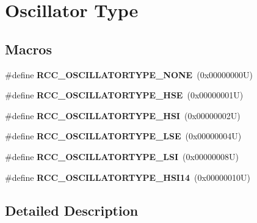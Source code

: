 \hypertarget{group___r_c_c___oscillator___type}{}\section{Oscillator Type}
\label{group___r_c_c___oscillator___type}
\subsection*{Macros}
\begin{DoxyCompactItemize}
\item 
\mbox{\label{group___r_c_c___oscillator___type_ga5a790362c5d7c4263f0f75a7367dd6b9}} 
\#define {\bfseries R\+C\+C\+\_\+\+O\+S\+C\+I\+L\+L\+A\+T\+O\+R\+T\+Y\+P\+E\+\_\+\+N\+O\+NE}~(0x00000000\+U)
\item 
\mbox{\label{group___r_c_c___oscillator___type_ga28cacd402dec84e548c9e4ba86d4603f}} 
\#define {\bfseries R\+C\+C\+\_\+\+O\+S\+C\+I\+L\+L\+A\+T\+O\+R\+T\+Y\+P\+E\+\_\+\+H\+SE}~(0x00000001\+U)
\item 
\mbox{\label{group___r_c_c___oscillator___type_gaa7ff7cbe9b0c2c511b0d0555e2a32a23}} 
\#define {\bfseries R\+C\+C\+\_\+\+O\+S\+C\+I\+L\+L\+A\+T\+O\+R\+T\+Y\+P\+E\+\_\+\+H\+SI}~(0x00000002\+U)
\item 
\mbox{\label{group___r_c_c___oscillator___type_ga7036aec5659343c695d795e04d9152ba}} 
\#define {\bfseries R\+C\+C\+\_\+\+O\+S\+C\+I\+L\+L\+A\+T\+O\+R\+T\+Y\+P\+E\+\_\+\+L\+SE}~(0x00000004\+U)
\item 
\mbox{\label{group___r_c_c___oscillator___type_ga3b7abb8ce0544cca0aa4550540194ce2}} 
\#define {\bfseries R\+C\+C\+\_\+\+O\+S\+C\+I\+L\+L\+A\+T\+O\+R\+T\+Y\+P\+E\+\_\+\+L\+SI}~(0x00000008\+U)
\item 
\mbox{\label{group___r_c_c___oscillator___type_ga7d221efb3191ac268263237e5c893063}} 
\#define {\bfseries R\+C\+C\+\_\+\+O\+S\+C\+I\+L\+L\+A\+T\+O\+R\+T\+Y\+P\+E\+\_\+\+H\+S\+I14}~(0x00000010\+U)
\end{DoxyCompactItemize}


\subsection{Detailed Description}
